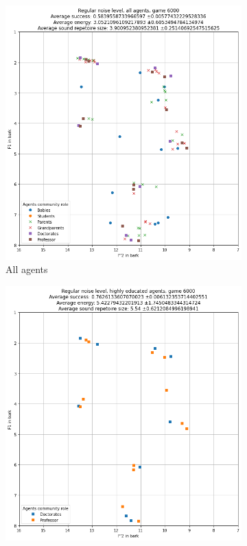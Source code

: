 \begin{figure}[ht]
    \centering
    \begin{subfigure}{.30\textwidth}
        \centering
        \includegraphics[width=\textwidth]{images/results/noise_std_all.png}
        \captionsetup{width=0.9\linewidth}
        \captionsetup{justification=centering}
        \caption{All agents}
    \end{subfigure}
    \hspace{0.5cm}
    \begin{subfigure}{.30\textwidth}
        \centering
        \includegraphics[width=\textwidth]{images/results/noise_std_high.png}

\end{subfigure}
\end{figure}
